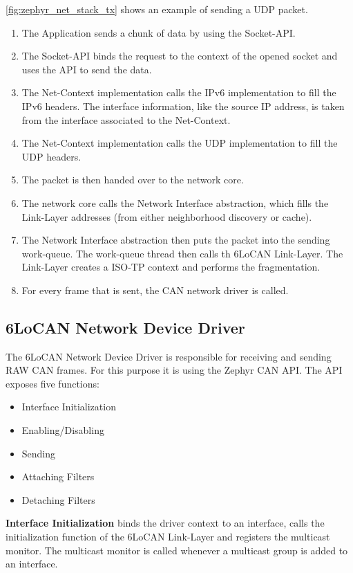 \autoref{fig:zephyr_net_stack_tx} shows an example of sending a UDP packet.
\begin{enumerate}
        \item The Application sends a chunk of data by using the Socket-API.
        \item The Socket-API binds the request to the context of the opened socket and uses the API to send the data.
        \item The Net-Context implementation calls the IPv6 implementation to fill the IPv6 headers. The interface information, like the source IP address,
              is taken from the interface associated to the Net-Context.
        \item The Net-Context implementation calls the UDP implementation to fill the UDP headers.
        \item The packet is then handed over to the network core.
        \item The network core calls the Network Interface abstraction, which fills the Link-Layer addresses (from either neighborhood discovery or cache).
        \item The Network Interface abstraction then puts the packet into the sending work-queue. The work-queue thread then calls th 6LoCAN Link-Layer.
              The Link-Layer creates a ISO-TP context and performs the fragmentation.
        \item For every frame that is sent, the CAN network driver is called.
\end{enumerate}

\FloatBarrier
\subsection{6LoCAN Network Device Driver}
\label{sec:6locan_net_dev}

The 6LoCAN Network Device Driver is responsible for receiving and sending RAW CAN frames.
For this purpose it is using the Zephyr CAN API.
The API exposes five functions:
\begin{itemize}
        \item Interface Initialization
        \item Enabling/Disabling
        \item Sending
        \item Attaching Filters
        \item Detaching Filters
\end{itemize}

\textbf{Interface Initialization} binds the driver context to an interface, calls the initialization function of the 6LoCAN Link-Layer and registers the multicast monitor.
The multicast monitor is called whenever a multicast group is added to an interface.

